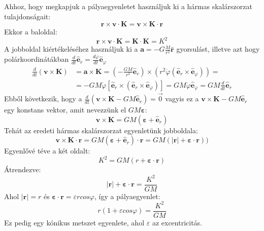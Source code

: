 \documentclass[a4paper,12pt]{article}
\begin{document}
Ahhoz, hogy megkapjuk a pályaegyenletet használjuk ki a hármas skalárszorzat tulajdonságait:
\begin{equation}
    \mathbf{r} \times \mathbf{v} \cdot \mathbf{K} = \mathbf{v} \times \mathbf{K} \cdot \mathbf{r}
\end{equation}
Ekkor a baloldal:
\begin{equation}
    \mathbf{r} \times \mathbf{v} \cdot \mathbf{K} = \mathbf{K} \cdot \mathbf{K} = K^2
\end{equation}
A jobboldal kiértékeléséhez használjuk ki a $\mathbf{a} = -G \frac{M}{r^2} \hat{\mathbf{r}}$ gyorsulást, illetve azt hogy polárkoordinátákban $\frac{d}{dt}\hat{\mathbf{e}}_r = \frac{d\varphi}{dt}\hat{\mathbf{e}}_\varphi$ 
\begin{equation}
    \begin{aligned}
        \frac{d}{dt} (\mathbf{v} \times \mathbf{K}) &= \mathbf{a} \times \mathbf{K} = \left(- \frac{GM}{r^2} \hat{\mathbf{e}}_r\right) \times \left(r^2 \dot{\varphi} (\hat{\mathbf{e}}_r \times \hat{\mathbf{e}}_{\varphi})\right) = \\
        &= -GM \dot{\varphi} \left[\hat{\mathbf{e}}_r \times (\hat{\mathbf{e}}_r \times \hat{\mathbf{e}}_{\varphi})\right] = GM \dot{\varphi} \hat{\mathbf{e}}_{\varphi} = GM \frac{d}{dt} \hat{\mathbf{e}}_r
    \end{aligned}
\end{equation}
Ebből következik, hogy a $\frac{d}{dt} (\mathbf{v} \times \mathbf{K} - GM \hat{\mathbf{e}}_r) = \vec{0}$ vagyis ez a $\mathbf{v} \times \mathbf{K} - GM \hat{\mathbf{e}}_r$ egy konstans vektor,
amit nevezzünk el $GM\boldsymbol{\varepsilon}$:
\begin{equation}
    \mathbf{v} \times \mathbf{K} = GM (\boldsymbol{\varepsilon} + \hat{\mathbf{e}}_r)
\end{equation}
Tehát az eredeti hármas skalárszorzat egyenletünk jobboldala:
\begin{equation}
    \mathbf{v} \times \mathbf{K} \cdot \mathbf{r} = GM (\boldsymbol{\varepsilon} + \hat{\mathbf{e}}_r) \cdot \mathbf{r} = GM (|\mathbf{r}| + \boldsymbol{\varepsilon} \cdot \mathbf{r}))
\end{equation}
Egyenlővé téve a két oldalt:
\begin{equation}
    K^2 = GM (r + \boldsymbol{\varepsilon} \cdot \mathbf{r})
\end{equation}
Átrendezve:
\begin{equation}
    |\mathbf{r}| + \boldsymbol{\varepsilon} \cdot \mathbf{r} = \frac{K^2}{GM}
\end{equation}
Ahol $|\mathbf{r}| = r$ és $\boldsymbol{\varepsilon} \cdot \mathbf{r} = \varepsilon r cos\varphi$, így a pályaegyenlet:
\begin{equation}
    r (1 + \varepsilon cos\varphi) = \frac{K^2}{GM}
\end{equation}
Ez pedig egy kónikus metszet egyenlete, ahol $\varepsilon$ az excentricitás.
\end{document}
